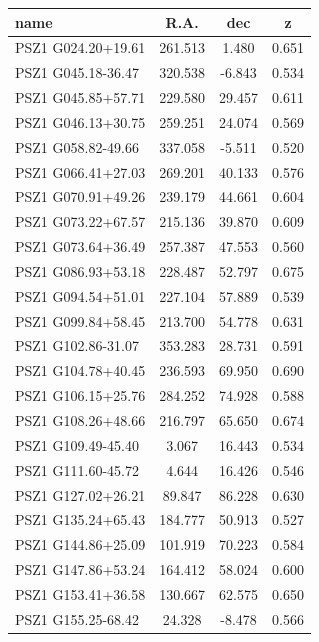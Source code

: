 \documentclass[11pt,a4paper,twoside,graphicx,color]{article}
\begin{document}
\begin{table}
\begin{tabular}{|l  || c | c | c | }
  \hline                       
name  &  R.A.  & dec  &   z \\ \hline
PSZ1 G024.20+19.61 & 261.513 &   1.480 &   0.651 \\ \hline
PSZ1 G045.18-36.47 & 320.538 &  -6.843 &   0.534 \\ \hline
PSZ1 G045.85+57.71 & 229.580 &  29.457 &   0.611 \\ \hline
PSZ1 G046.13+30.75 & 259.251 &  24.074 &   0.569 \\ \hline
PSZ1 G058.82-49.66 & 337.058 &  -5.511 &   0.520 \\ \hline
PSZ1 G066.41+27.03 & 269.201 &  40.133 &   0.576 \\ \hline
PSZ1 G070.91+49.26 & 239.179 &  44.661 &   0.604 \\ \hline
PSZ1 G073.22+67.57 & 215.136 &  39.870 &   0.609 \\ \hline
PSZ1 G073.64+36.49 & 257.387 &  47.553 &   0.560 \\ \hline
PSZ1 G086.93+53.18 & 228.487 &  52.797 &   0.675 \\ \hline
PSZ1 G094.54+51.01 & 227.104 &  57.889 &   0.539 \\ \hline
PSZ1 G099.84+58.45 & 213.700 &  54.778 &   0.631 \\ \hline
PSZ1 G102.86-31.07 & 353.283 &  28.731 &   0.591 \\ \hline
PSZ1 G104.78+40.45 & 236.593 &  69.950 &   0.690 \\ \hline
PSZ1 G106.15+25.76 & 284.252 &  74.928 &   0.588 \\ \hline
PSZ1 G108.26+48.66 & 216.797 &  65.650 &   0.674 \\ \hline
PSZ1 G109.49-45.40 &   3.067 &  16.443 &   0.534 \\ \hline
PSZ1 G111.60-45.72 &   4.644 &  16.426 &   0.546 \\ \hline
PSZ1 G127.02+26.21 &  89.847 &  86.228 &   0.630 \\ \hline
PSZ1 G135.24+65.43 & 184.777 &  50.913 &   0.527 \\ \hline
PSZ1 G144.86+25.09 & 101.919 &  70.223 &   0.584 \\ \hline
PSZ1 G147.86+53.24 & 164.412 &  58.024 &   0.600 \\ \hline
PSZ1 G153.41+36.58 & 130.667 &  62.575 &   0.650 \\ \hline
PSZ1 G155.25-68.42 &  24.328 &  -8.478 &   0.566 \\ \hline

\end{tabular}
\end{table}
\end{document}
